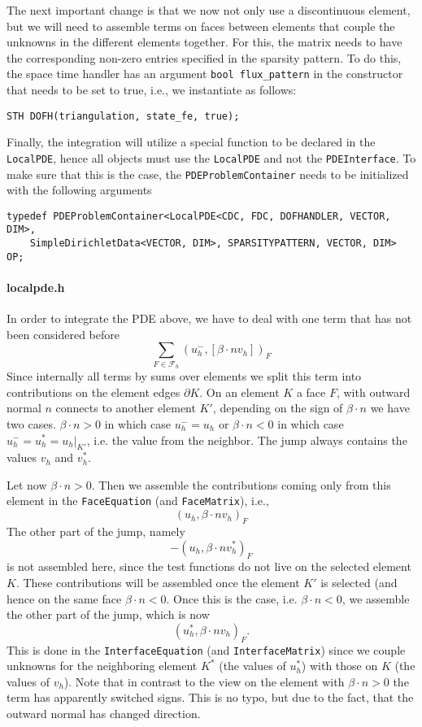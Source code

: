The next important change is that we now not only use a discontinuous element, but we will need to assemble 
terms on faces between elements that couple the unknowns in the different elements together. For this,
the matrix needs to have the corresponding non-zero entries specified in the sparsity pattern.  
To do this, the space time handler has an argument \texttt{bool flux\_pattern} in the constructor that needs to be set to true, i.e., we instantiate as follows: 
\begin{verbatim}
STH DOFH(triangulation, state_fe, true);
\end{verbatim}

Finally, the integration will utilize a special function to be declared in the \texttt{LocalPDE}, 
hence all objects must use the \texttt{LocalPDE}
and not the \texttt{PDEInterface}.
To make sure that this is the case, the \texttt{PDEProblemContainer} needs to be initialized with the following arguments
\begin{verbatim}
typedef PDEProblemContainer<LocalPDE<CDC, FDC, DOFHANDLER, VECTOR, DIM>,
    SimpleDirichletData<VECTOR, DIM>, SPARSITYPATTERN, VECTOR, DIM> OP;
\end{verbatim}

\paragraph{localpde.h}
In order to integrate the PDE above, we have to deal with one term that has not been considered before
\[
 \sum_{F \in \mathcal F_h} (u_h^-,[\beta \cdot n v_h])_F 
\]
Since internally all terms by sums over elements we split this term into contributions on the 
element edges $\partial K$. On an element $K$ a face $F$, with outward normal $n$ 
connects to another element $K'$, depending on the sign of $\beta \cdot n$ we have two cases. 
$\beta \cdot n > 0$ in which case $u^-_h = u_h$ or $\beta \cdot n < 0$ in which case $u^-_h = u_h^* = u_h\lvert_{K'}$, i.e.
the value from the neighbor. The jump always contains the values $v_h$ and $v_h^*$. 

Let now $\beta \cdot n > 0$. Then we assemble the contributions coming only from this element in the \texttt{FaceEquation} 
(and \texttt{FaceMatrix}),
i.e.,
\[
 (u_h,\beta \cdot n v_h)_F
\]
The other part of the jump, namely 
\[
 -(u_h,\beta \cdot n v_h^*)_F
\]
is not assembled here, since the test functions do not live on the selected element $K$. These contributions will
be assembled once the element $K'$ is selected (and hence on the same face $\beta \cdot n < 0$.
Once this is the case, i.e. $\beta \cdot n < 0$, we assemble the other part of the jump,
which is now 
\[
(u_h^*,\beta \cdot n v_h)_F.
\]
This is done in the \texttt{InterfaceEquation} (and \texttt{InterfaceMatrix}) since we couple unknowns for the neighboring element $K^*$ (the values of $u_h^*$) with those on $K$ (the values of $v_h$). Note that in contrast to the view on the element with 
$\beta \cdot n > 0$ the term has apparently switched signs. This is no typo, but due to the fact, that the outward normal 
has changed direction.

